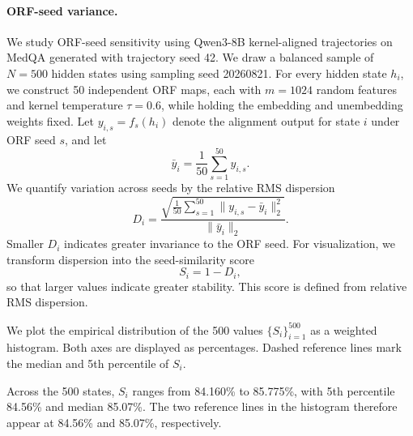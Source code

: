 \documentclass[11pt]{article}
\begin{document}
\paragraph{ORF-seed variance.} 
\label{app:orf}
We study ORF-seed sensitivity using Qwen3-8B kernel-aligned trajectories on MedQA generated with trajectory seed 42. We draw a balanced sample of $N=500$ hidden states using sampling seed 20260821. For every hidden state $h_i$, we construct 50 independent ORF maps, each with $m=1024$ random features and kernel temperature $\tau=0.6$, while holding the embedding and unembedding weights fixed. Let $y_{i,s}=f_s(h_i)$ denote the alignment output for state $i$ under ORF seed $s$, and let
\[
\bar y_i=\frac{1}{50}\sum_{s=1}^{50}y_{i,s}.
\]
We quantify variation across seeds by the relative RMS dispersion
\[
D_i=
\frac{\sqrt{\frac{1}{50}\sum_{s=1}^{50}\lVert y_{i,s}-\bar y_i\rVert_2^2}}
{\lVert\bar y_i\rVert_2}.
\]
Smaller $D_i$ indicates greater invariance to the ORF seed. For visualization, we transform dispersion into the seed-similarity score
\[
S_i=1-D_i,
\]
so that larger values indicate greater stability. This score is defined from relative RMS dispersion.

We plot the empirical distribution of the 500 values $\{S_i\}_{i=1}^{500}$ as a weighted histogram. Both axes are displayed as percentages. Dashed reference lines mark the median and 5th percentile of $S_i$. 

Across the 500 states, $S_i$ ranges from 84.160\% to 85.775\%, with 5th percentile 84.56\% and median 85.07\%. The two reference lines in the histogram therefore appear at 84.56\% and 85.07\%, respectively.

\end{document}
